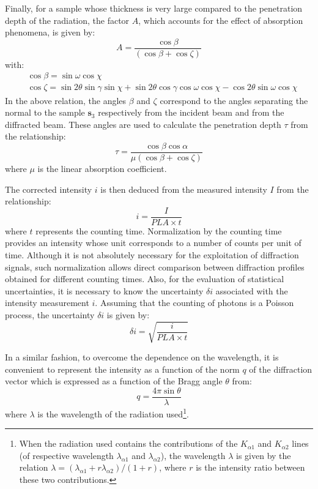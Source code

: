 \documentclass[french,a4paper]{report}
\begin{document}
Finally, for a sample whose thickness is very large compared to the penetration depth of the radiation, the factor $A$, which accounts for the effect of absorption phenomena, is given by:
\begin{equation}
A = \frac{\cos \beta }{  \left(\cos \beta + \cos \zeta \right)} %
\end{equation}
with:
\begin{align}
&\cos \beta = \sin \omega \cos \chi\\
&\cos \zeta = \sin 2 \theta \sin \gamma \sin \chi + \sin 2 \theta \cos \gamma \cos \omega \cos \chi -\cos 2 \theta \sin \omega \cos \chi
\end{align}
In the above relation, the angles $\beta$ and $\zeta$ correspond to the angles separating the normal to the sample $\boldsymbol s_3$ respectively from the incident beam and from the diffracted beam. These angles are used to calculate the penetration depth $\tau$ from the relationship:
\begin{equation}
\tau = \frac{\cos \beta \cos \alpha}{ \mu \left(\cos \beta + \cos \zeta \right)} %
\end{equation}
where $\mu$ is the linear absorption coefficient.

The corrected intensity $i$ is then deduced from the measured intensity $I$ from the relationship:
\begin{equation}
i = \frac{I}{PLA \times t}
\end{equation}
where $t$ represents the counting time. Normalization by the counting time provides an intensity whose unit corresponds to a number of counts per unit of time. Although it is not absolutely necessary for the exploitation of diffraction signals, such normalization allows direct comparison between diffraction profiles obtained for different counting times. Also, for the evaluation of statistical uncertainties, it is necessary to know the uncertainty $\delta i$ associated with the intensity measurement $i$. Assuming that the counting of photons is a Poisson process, the uncertainty $\delta i$ is given by:
\begin{equation}
\delta i = \sqrt{\frac{i}{ PLA \times t}}
\end{equation}

In a similar fashion, to overcome the dependence on the wavelength, it is convenient to represent the intensity as a function of the norm $q$ of the diffraction vector which is expressed as a function of the Bragg angle $\theta$ from:
\begin{equation}
q = \frac{4 \pi \sin \theta}{\lambda}
\end{equation}
where $\lambda$ is the wavelength of the radiation used\footnote{When the radiation used contains the contributions of the $K_{\alpha 1}$ and $K_{\alpha 2}$ lines (of respective wavelength $\lambda_{\alpha 1}$ and $\lambda_{\alpha 2}$), the wavelength $\lambda$ is given by the relation $\lambda = (\lambda_{\alpha 1} + r \lambda_{\alpha 2})/(1+r)$, where $r$ is the intensity ratio between these two contributions.}.
\end{document}
